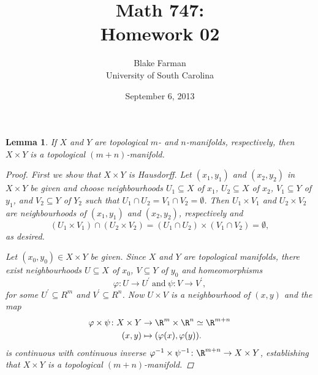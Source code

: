 \documentclass[10pt]{amsart}
\author{Blake Farman\\University of South Carolina}
\title{Math 747:\\Homework 02}
\date{September 6, 2013}
\begin{document}
\maketitle

\providecommand{\p}{\mathfrak{p}}
\providecommand{\m}{\mathfrak{m}}

\newtheorem{thm}{}
\newtheorem{lem}{Lemma}

\begin{lem}\label{lem1}
	If $X$ and $Y$ are topological $m$- and $n$-manifolds, respectively, then $X \times Y$ is a topological $(m +n)$-manifold.

	\begin{proof}
		First we show that $X \times Y$ is Hausdorff.
		Let $(x_1, y_1)$ and $(x_2, y_2)$ in $X \times Y$ be given and choose neighbourhoods $U_1 \subseteq X$ of $x_1$, $U_2 \subseteq X$ of $x_2$, $V_1 \subseteq Y$ of $y_1$, and $V_2 \subseteq Y$ of $Y_2$ such that $U_1 \cap U_2 = V_1 \cap V_2 = \emptyset$.
		Then $U_1 \times V_1$ and $U_2 \times V_2$ are neighbourhoods of $(x_1, y_1)$ and $(x_2, y_2)$, respectively and
		$$(U_1 \times V_1) \cap (U_2 \times V_2) = (U_1 \cap U_2) \times (V_1 \cap V_2) = \emptyset,$$
		as desired.

		Let $(x_0,y_0) \in X \times Y$ be given.
		Since $X$ and $Y$ are topological manifolds, there exist neighbourhoods $U \subseteq X$ of $x_0$, $V \subseteq Y$ of $y_0$ and homeomorphisms 
		$$\varphi \colon U \rightarrow U^\prime\ \text{and}\ \psi \colon V \rightarrow V^\prime,$$
		for some $U^\prime \subseteq R^m$ and $V^\prime \subseteq R^n$.
		Now $U \times V$ is a neighbourhood of $(x,y)$ and the map
		\begin{align*}
			\varphi \times \psi \colon X \times Y &\rightarrow \R^m \times \R^n \simeq \R^{m + n}\\
			(x,y) & \mapsto (\varphi(x), \varphi(y)).
		\end{align*}
		is continuous with continuous inverse $\varphi^{-1} \times \psi^{-1} \colon \R^{m+n} \rightarrow X \times Y$, establishing that $X \times Y$ is a topological $(m+n)$-manifold.
	\end{proof}
\end{lem}
\end{document}
